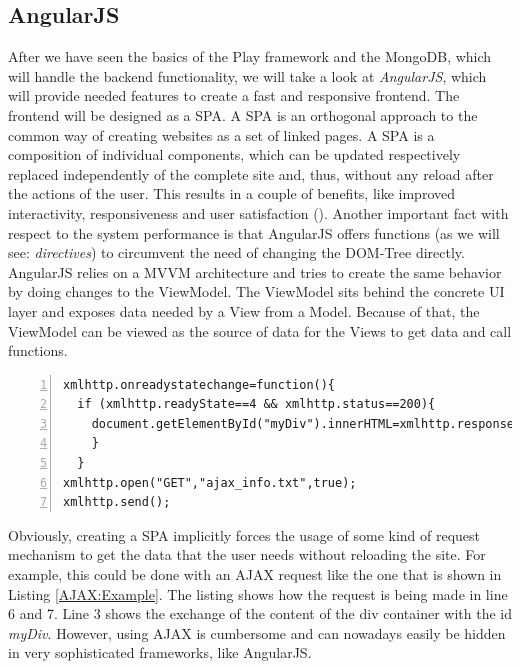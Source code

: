 \subsection{AngularJS}
\label{AngularJS}
After we have seen the basics of the Play framework and the MongoDB, which will handle the backend functionality, we will take a look at \textit{AngularJS}, which will provide needed features to create a fast and responsive frontend. The frontend will be designed as a \ac{SPA}. A \ac{SPA} is an orthogonal approach to the common way of creating websites as a set of linked pages. A \ac{SPA} is a composition of individual components, which can be updated respectively replaced independently of the complete site and, thus, without any reload after the actions of the user. This results in a couple of benefits, like improved interactivity, responsiveness and user satisfaction (\cite{Mes07}). Another important fact with respect to the system performance is that AngularJS offers functions (as we will see: \emph{directives}) to circumvent the need of changing the \ac{DOM}-Tree directly. AngularJS relies on a \ac{MVVM} architecture and tries to create the same behavior by doing changes to the ViewModel. The ViewModel sits behind the concrete \ac{UI} layer and exposes data needed by a View from a Model. Because of that, the ViewModel can be viewed as the source of data for the Views to get data and call functions. 

\begin{lstlisting}[numbers=left,caption={Simple example that shows the use of an AJAX request that shows the response text within a specific div container.},label=AJAX:Example,frame=tlbr,breaklines]
xmlhttp.onreadystatechange=function(){
  if (xmlhttp.readyState==4 && xmlhttp.status==200){
    document.getElementById("myDiv").innerHTML=xmlhttp.responseText;
    }
  }
xmlhttp.open("GET","ajax_info.txt",true);
xmlhttp.send();
\end{lstlisting}

Obviously, creating a \ac{SPA} implicitly forces the usage of some kind of request mechanism to get the data that the user needs without reloading the site. For example, this could be done with an \ac{AJAX} request like the one that is shown in Listing \ref{AJAX:Example}. The listing shows how the request is being made in line 6 and 7. Line 3 shows the exchange of the content of the div container with the id \textit{myDiv}. However, using \ac{AJAX} is cumbersome and can nowadays easily be hidden in very sophisticated frameworks, like AngularJS.

